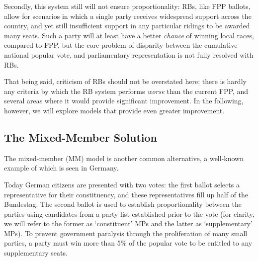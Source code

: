 Secondly, this system still will not ensure proportionality: RBs, like FPP ballots, allow for scenarios in which a single party receives widespread support across the country, and yet still insufficient support in any particular ridings to be awarded many seats.
Such a party will at least have a better \emph{chance} of winning local races, compared to FPP, but the core problem of disparity between the cumulative national popular vote, and parliamentary representation is not fully resolved with RBs.

That being said, criticism of RBs should not be overstated here; there is hardly any criteria by which the RB system performs \emph{worse} than the current FPP, and several areas where it would provide significant improvement.
In the following, however, we will explore models that provide even greater improvement.


\subsection{The Mixed-Member Solution}
\label{sec:german_model}

The mixed-member (MM) model is another common alternative, a well-known example of which is seen in Germany.

Today German citizens are presented with two votes: the first ballot selects a representative for their constituency, and these representatives fill up half of the Bundestag.
The second ballot is used to establish proportionality between the parties using candidates from a party list established prior to the vote
(for clarity, we will refer to the former as `constituent' MPs  and the latter as `supplementary' MPs).
To prevent government paralysis through the proliferation of many small parties, a party must win more than 5\% of the popular vote to be entitled to any supplementary seats.

